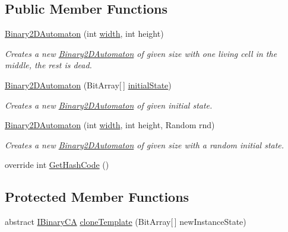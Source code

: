 \subsection*{Public Member Functions}
\begin{DoxyCompactItemize}
\item 
\hyperlink{class_cellular_1_1_binary2_d_automaton_a6956aa8cc05e4d00c116d8cc5e8528d4}{Binary2\+D\+Automaton} (int \hyperlink{class_cellular_1_1_automaton2_d_a1e9e5ec637c747a859c346839c90d174}{width}, int height)
\begin{DoxyCompactList}\small\item\em Creates a new {\ttfamily \hyperlink{class_cellular_1_1_binary2_d_automaton}{Binary2\+D\+Automaton}} of given size with one living cell in the middle, the rest is dead. \end{DoxyCompactList}\item 
\hyperlink{class_cellular_1_1_binary2_d_automaton_ab2bdc13f759e29b0efe84995c74e5006}{Binary2\+D\+Automaton} (Bit\+Array\mbox{[}$\,$\mbox{]} \hyperlink{all__1_8js_ae8b87ff4be2ae1dd5267342795263360}{initial\+State})
\begin{DoxyCompactList}\small\item\em Creates a new {\ttfamily \hyperlink{class_cellular_1_1_binary2_d_automaton}{Binary2\+D\+Automaton}} of given initial state. \end{DoxyCompactList}\item 
\hyperlink{class_cellular_1_1_binary2_d_automaton_a465d87aeab9f265595e942e46308f75f}{Binary2\+D\+Automaton} (int \hyperlink{class_cellular_1_1_automaton2_d_a1e9e5ec637c747a859c346839c90d174}{width}, int height, Random rnd)
\begin{DoxyCompactList}\small\item\em Creates a new {\ttfamily \hyperlink{class_cellular_1_1_binary2_d_automaton}{Binary2\+D\+Automaton}} of given size with a random initial state. \end{DoxyCompactList}\item 
override int \hyperlink{class_cellular_1_1_binary2_d_automaton_af0b06d58b66367dbeb712f2c4237ff54}{Get\+Hash\+Code} ()
\end{DoxyCompactItemize}
\subsection*{Protected Member Functions}
\begin{DoxyCompactItemize}
\item 
abstract \hyperlink{interface_cellular_1_1_i_binary_c_a}{I\+Binary\+C\+A} \hyperlink{class_cellular_1_1_binary2_d_automaton_ad2d31668c7b8f8e959575e03b995273f}{clone\+Template} (Bit\+Array\mbox{[}$\,$\mbox{]} new\+Instance\+State)
\end{DoxyCompactItemize}
